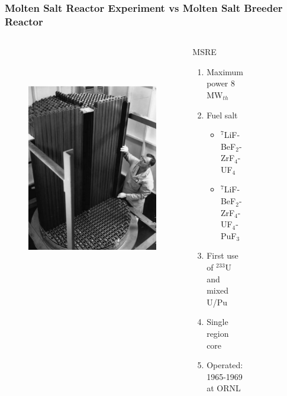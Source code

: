 \begin{frame}
  \frametitle{Molten Salt Reactor Experiment vs Molten Salt Breeder Reactor}
  \begin{columns}
    \column[t]{5.6cm}
               \begin{figure}[t]
                \vspace*{-0.3in}
                \includegraphics[height=0.7\textwidth]{./images/msre_view.png}
                \vspace*{-0.2in}
      \end{figure}
     \begin{block}{\gls{MSRE}}
       \begin{enumerate}
              \item Maximum power 8 MW$_{th}$
               \item Fuel salt
                \begin{itemize}
                   \item $^7$LiF-BeF$_2$-ZrF$_4$-UF$_4$
                   \item $^7$LiF-BeF$_2$-ZrF$_4$-UF$_4$-PuF$_3$
                \end{itemize}  
              \item First use of $^{233}$U and mixed U/Pu
              \item Single region core
              \item Operated: 1965-1969 at ORNL
              \end{enumerate}
     \end{block}
     \column[t]{5.6cm}
           \begin{figure}[t]
                \vspace*{-0.3in}

\end{figure}
\end{columns}
\end{frame}

